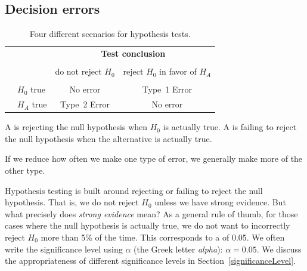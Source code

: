 
\subsection{Decision errors}


\begin{table}%
\centering
\begin{tabular}{l l c c}
& & \multicolumn{2}{c}{\textbf{Test conclusion}} \\
  \cline{3-4}
\vspace{-3.7mm} \\
& & do not reject $H_0$ &  reject $H_0$ in favor of $H_A$ \\
  \cline{2-4}
\vspace{-3.7mm} \\
& $H_0$ true & No error &  Type~1 Error \\
\raisebox{1.5ex}{\textbf{Truth}} & $H_A$ true & Type~2 Error & No error \\
  \cline{2-4}
\end{tabular}
\caption{Four different scenarios for hypothesis tests.}
\label{fourHTScenarios}
\end{table}

A  is rejecting the null hypothesis when $H_0$ is actually true. A  is failing to reject the null hypothesis when the alternative is actually true.



If we reduce how often we make one type of error, we generally make more of the other type.

Hypothesis testing is built around rejecting or failing to reject the null hypothesis. That is, we do not reject $H_0$ unless we have strong evidence. But what precisely does \emph{strong evidence} mean? As a general rule of thumb, for those cases where the null hypothesis is actually true, we do not want to incorrectly reject $H_0$ more than 5\% of the time. This corresponds to a  of 0.05. We often write the significance level using $\alpha$ (the Greek letter \emph{alpha}): $\alpha = 0.05$. We discuss the appropriateness of different significance levels in Section~\ref{significanceLevel}.


